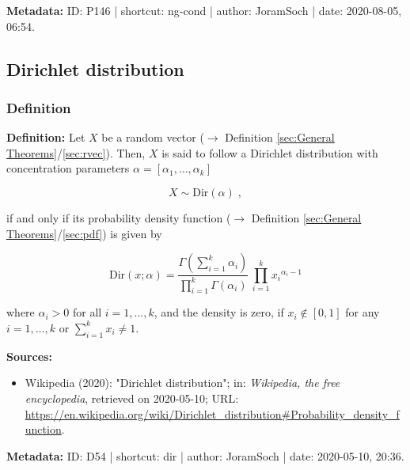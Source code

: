 \documentclass[a4paper,12pt,twoside]{book}
\begin{document}
\vspace{1em}
\textbf{Metadata:} ID: P146 | shortcut: ng-cond | author: JoramSoch | date: 2020-08-05, 06:54.
\vspace{1em}



\subsection{Dirichlet distribution}

\subsubsection[\textit{Definition}]{Definition} \label{sec:dir}
\setcounter{equation}{0}

\textbf{Definition:} Let $X$ be a random vector ($\rightarrow$ Definition \ref{sec:General Theorems}/\ref{sec:rvec}). Then, $X$ is said to follow a Dirichlet distribution with concentration parameters $\alpha = \left[ \alpha_1, \ldots, \alpha_k \right]$

\begin{equation} \label{eq:dir-Dir}
X \sim \mathrm{Dir}(\alpha) \; ,
\end{equation}

if and only if its probability density function ($\rightarrow$ Definition \ref{sec:General Theorems}/\ref{sec:pdf}) is given by

\begin{equation} \label{eq:dir-beta-pdf}
\mathrm{Dir}(x; \alpha) = \frac{\Gamma\left( \sum_{i=1}^k \alpha_i \right)}{\prod_{i=1}^k \Gamma(\alpha_i)} \, \prod_{i=1}^k {x_i}^{\alpha_i-1}
\end{equation}

where $\alpha_i > 0$ for all $i = 1, \ldots, k$, and the density is zero, if $x_i \notin [0,1]$ for any $i = 1, \ldots, k$ or $\sum_{i=1}^k x_i \neq 1$.


\vspace{1em}
\textbf{Sources:}
\begin{itemize}
\item Wikipedia (2020): "Dirichlet distribution"; in: \textit{Wikipedia, the free encyclopedia}, retrieved on 2020-05-10; URL: \url{https://en.wikipedia.org/wiki/Dirichlet_distribution#Probability_density_function}.
\end{itemize}


\vspace{1em}
\textbf{Metadata:} ID: D54 | shortcut: dir | author: JoramSoch | date: 2020-05-10, 20:36.
\vspace{1em}
\end{document}
